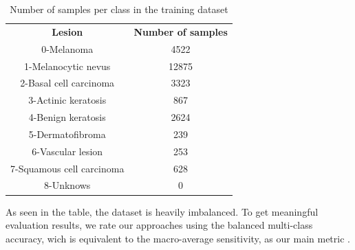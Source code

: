 \begin{table}[ht]
    \caption{Number of samples per class in the training dataset}
    \begin{center}
    \begin{tabular}{c|c}
        \hline
        \textbf{Lesion}&\textbf{Number of samples} \\
        0-Melanoma &  4522 \\
        1-Melanocytic nevus & 12875  \\
        2-Basal cell carcinoma & 3323 \\
        3-Actinic keratosis & 867 \\
        4-Benign keratosis & 2624 \\
        5-Dermatofibroma & 239 \\
        6-Vascular lesion & 253 \\
        7-Squamous cell carcinoma & 628 \\
        8-Unknows & 0 \\
        \hline
    \end{tabular}
    \label{tab:data}
    \end{center}
\end{table}

As seen in the table, the dataset is heavily imbalanced. To get meaningful evaluation results, we rate our approaches using the  balanced multi-class accuracy, wich is equivalent to the macro-average sensitivity, as our main metric \cite{Mosley2013}. 

